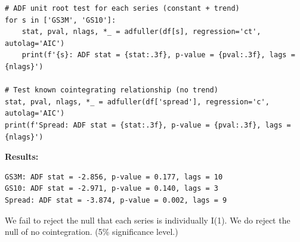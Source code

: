 
\begin{frame}[fragile]
\scriptsize
\begin{verbatim}
# ADF unit root test for each series (constant + trend)
for s in ['GS3M', 'GS10']:
    stat, pval, nlags, *_ = adfuller(df[s], regression='ct', autolag='AIC')
    print(f'{s}: ADF stat = {stat:.3f}, p-value = {pval:.3f}, lags = {nlags}')

# Test known cointegrating relationship (no trend)
stat, pval, nlags, *_ = adfuller(df['spread'], regression='c', autolag='AIC')
print(f'Spread: ADF stat = {stat:.3f}, p-value = {pval:.3f}, lags = {nlags}')
\end{verbatim}
\normalsize \bigskip
\textbf{Results:}
\smallskip \scriptsize
\begin{verbatim}
GS3M: ADF stat = -2.856, p-value = 0.177, lags = 10
GS10: ADF stat = -2.971, p-value = 0.140, lags = 3
Spread: ADF stat = -3.874, p-value = 0.002, lags = 9
\end{verbatim}
\normalsize \bigskip
We fail to reject the null that each series is individually I(1). We do reject the null of no cointegration. (5\% significance level.)
\end{frame}

